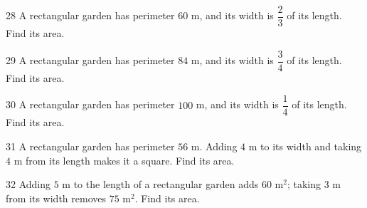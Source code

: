 \gap
\begin{probbox}{28}{\relax}
A rectangular garden has perimeter $60$ m, and its width is $\dfrac{2}{3}$ of its length. Find its area.
\end{probbox}
\gap
\begin{probbox}{29}{\relax}
A rectangular garden has perimeter $84$ m, and its width is $\dfrac{3}{4}$ of its length. Find its area.
\end{probbox}
\gap
\begin{probbox}{30}{\relax}
A rectangular garden has perimeter $100$ m, and its width is $\dfrac{1}{4}$ of its length. Find its area.
\end{probbox}
\begin{probbox}{31}{}
A rectangular garden has perimeter $56$ m. Adding $4$ m to its width and taking $4$ m from its length makes it a square. Find its area.
\end{probbox}
\gap
\begin{probbox}{32}{}
Adding $5$ m to the length of a rectangular garden adds $60$ m$^2$; taking $3$ m from its width removes $75$ m$^2$. Find its area.
\end{probbox}
\gap
